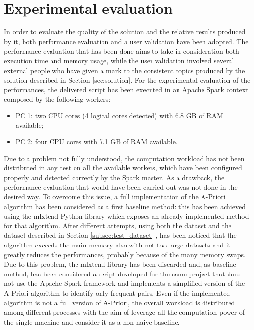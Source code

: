 \section{Experimental evaluation}
\label{sec:experimental_evaluation}
In order to evaluate the quality of the solution and the relative results produced by it, both performance evaluation and a user validation have been adopted. The performance evaluation that has been done aims to take in consideration both execution time and memory usage, while the user validation involved several external people who have given a mark to the consistent topics produced by the solution described in Section \ref{sec:solution}.
For the experimental evaluation of the performances, the delivered script has been executed in an Apache Spark context composed by the following workers:
\begin{itemize}
	\item PC 1: two CPU cores (4 logical cores detected) with 6.8 GB of RAM available;
	\item PC 2: four CPU cores with 7.1 GB of RAM available.
\end{itemize}
Due to a problem not fully understood, the computation workload has not been distributed in any test on all the available workers, which have been configured properly and detected correctly by the Spark master. As a drawback, the performance evaluation that would have been carried out was not done in the desired way. To overcome this issue, a full implementation of the A-Priori algorithm has been considered as a first baseline method: this has been achieved using the mlxtend Python library \cite{mlxtend-reference} which exposes an already-implemented method for that algorithm. After different attempts, using both the dataset \cite{covid19-tweets-dataset} and the dataset described in Section \ref{subsec:test_dataset} \cite{sentiment-analysis-dataset}, has been noticed that the algorithm exceeds the main memory also with not too large datasets and it greatly reduces the performances, probably because of the many memory swaps. Due to this problem, the mlxtend library has been discarded and, as baseline method, has been considered a script developed for the same project that does not use the Apache Spark framework and implements a simplified version of the A-Priori algorithm to identify only frequent pairs. Even if the implemented algorithm is not a full version of A-Priori, the overall workload is distributed among different processes with the aim of leverage all the computation power of the single machine and consider it as a non-naive baseline. 

